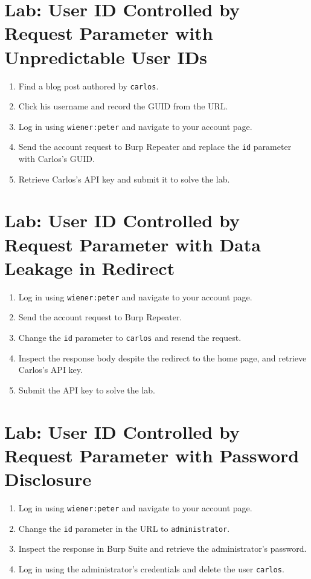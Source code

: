\documentclass[11pt,a4paper]{article}
\begin{document}
\section{Lab: User ID Controlled by Request Parameter with Unpredictable User IDs}
\vspace{0.3cm}

\begin{enumerate}
    \item Find a blog post authored by \texttt{carlos}.
    \item Click his username and record the GUID from the URL.
    \item Log in using \texttt{wiener:peter} and navigate to your account page.
    \item Send the account request to Burp Repeater and replace the \texttt{id} parameter with Carlos's GUID.
    \item Retrieve Carlos's API key and submit it to solve the lab.
\end{enumerate}

\section{Lab: User ID Controlled by Request Parameter with Data Leakage in Redirect}
\vspace{0.3cm}

\begin{enumerate}
    \item Log in using \texttt{wiener:peter} and navigate to your account page.
    \item Send the account request to Burp Repeater.
    \item Change the \texttt{id} parameter to \texttt{carlos} and resend the request.
    \item Inspect the response body despite the redirect to the home page, and retrieve Carlos's API key.
    \item Submit the API key to solve the lab.
\end{enumerate}

\newpage
\section{Lab: User ID Controlled by Request Parameter with Password Disclosure}
\vspace{0.3cm}

\begin{enumerate}
    \item Log in using \texttt{wiener:peter} and navigate to your account page.
    \item Change the \texttt{id} parameter in the URL to \texttt{administrator}.
    \item Inspect the response in Burp Suite and retrieve the administrator's password.
    \item Log in using the administrator's credentials and delete the user \texttt{carlos}.
\end{enumerate}
\end{document}

